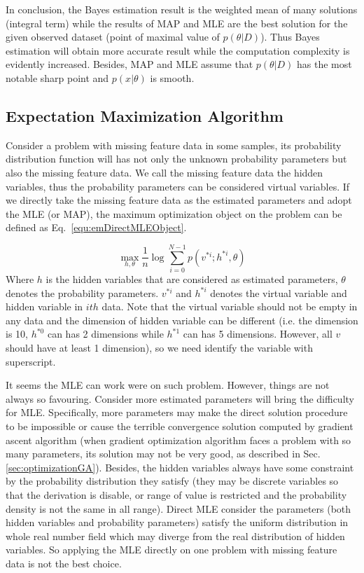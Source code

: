 \documentclass[runningheads,openany]{xhlPaper}
\begin{document}
In conclusion, the Bayes estimation result is the weighted mean of many solutions (integral term) while the results of MAP and MLE are the best solution for the given observed dataset (point of maximal value of $p\left( {\theta |D} \right)$). Thus Bayes estimation will obtain more accurate result while the computation complexity is evidently increased. Besides, MAP and MLE assume that $p\left( {\theta |D} \right)$ has the most notable sharp point and $p\left( {x|\theta } \right)$ is smooth.

\subsection{Expectation Maximization Algorithm}
\label{sec:em}
Consider a problem with missing feature data in some samples, its probability distribution function will has not only the unknown probability parameters but also the missing feature data. We call the missing feature data the hidden variables, thus the probability parameters can be considered virtual variables. If we directly take the missing feature data as the estimated parameters and adopt the MLE (or MAP), the maximum optimization object on the problem can be defined as Eq.~\ref{equ:emDirectMLEObject}.

\begin{equation}
\label{equ:emDirectMLEObject}
\mathop {\max }\limits_{h,\theta } \frac{1}{n}\log \sum\limits_{i = 0}^{N - 1} {p\left( {{v^{*i}};{h^{*i}},\theta } \right)}
\end{equation}
Where $h$ is the hidden variables that are considered as estimated parameters, $\theta$ denotes the probability parameters. $v^{*i}$ and $h^{*i}$ denotes the virtual variable and hidden variable in $ith$ data. Note that the virtual variable should not be empty in any data and the dimension of hidden variable can be different (i.e. the dimension is 10, $h^{*0}$ can has 2 dimensions while $h^{*1}$ can has 5 dimensions. However, all $v$ should have at least 1 dimension), so we need identify the variable with superscript.

It seems the MLE can work were on such problem. However, things are not always so favouring. Consider more estimated parameters will bring the difficulty for MLE. Specifically, more parameters may make the direct solution procedure to be impossible or cause the terrible convergence solution computed by gradient ascent algorithm (when gradient optimization algorithm faces a problem with so many parameters, its solution may not be very good, as described in Sec.\ref{sec:optimizationGA}). Besides, the hidden variables always have some constraint by the probability distribution they satisfy (they may be discrete variables so that the derivation is disable, or range of value is restricted and the probability density is not the same in all range). Direct MLE consider the parameters (both hidden variables and probability parameters) satisfy the uniform distribution in whole real number field which may diverge from the real distribution of hidden variables. So applying the MLE directly on one problem with missing feature data is not the best choice.
\end{document}

